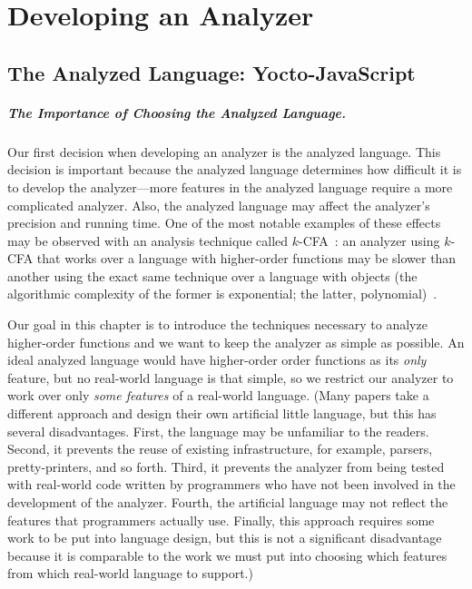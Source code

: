 \documentclass[12pt, oneside]{book}
\begin{document}
\chapter{Developing an Analyzer}


\section{The Analyzed Language: Yocto-JavaScript}

\paragraph{The Importance of Choosing the Analyzed Language.}

Our first decision when developing an analyzer is the analyzed language. This decision is important because the analyzed language determines how difficult it is to develop the analyzer—more features in the analyzed language require a more complicated analyzer. Also, the analyzed language may affect the analyzer’s precision and running time. One of the most notable examples of these effects may be observed with an analysis technique called \(k\)-CFA~\cite{k-cfa}: an analyzer using \(k\)-CFA that works over a language with higher-order functions may be slower than another using the exact same technique over a language with objects (the algorithmic complexity of the former is exponential; the latter, polynomial)~\cite{m-cfa}.

Our goal in this chapter is to introduce the techniques necessary to analyze higher-order functions and we want to keep the analyzer as simple as possible. An ideal analyzed language would have higher-order order functions as its \emph{only} feature, but no real-world language is that simple, so we restrict our analyzer to work over only \emph{some features} of a real-world language. (Many papers take a different approach and design their own artificial little language, but this has several disadvantages. First, the language may be unfamiliar to the readers. Second, it prevents the reuse of existing infrastructure, for example, parsers, pretty-printers, and so forth. Third, it prevents the analyzer from being tested with real-world code written by programmers who have not been involved in the development of the analyzer. Fourth, the artificial language may not reflect the features that programmers actually use. Finally, this approach requires some work to be put into language design, but this is not a significant disadvantage because it is comparable to the work we must put into choosing which features from which real-world language to support.)
\end{document}

